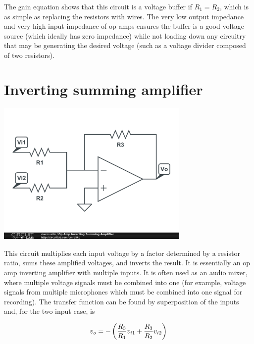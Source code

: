 The gain equation shows that this circuit is a voltage buffer if $R_1 = R_2$, which is as simple as replacing the resistors with wires.
The very low output impedance and very high input impedance of op amps ensures the buffer is a good voltage source (which ideally has zero impedance) while not loading down any circuitry that may be generating the desired voltage (such as a voltage divider composed of two resistors).

\section{Inverting summing amplifier}
\begin{center}
	\includegraphics[width=0.70\textwidth]{schematics/invsummingamp.PNG}
\end{center}

This circuit multiplies each input voltage by a factor determined by a resistor ratio, sums these amplified voltages, and inverts the result.
It is essentially an op amp inverting amplifier with multiple inputs.
It is often used as an audio mixer, where multiple voltage signals must be combined into one (for example, voltage signals from multiple microphones which must be combined into one signal for recording).
The transfer function can be found by superposition of the inputs and, for the two input case, is

\textcolor{red}{
\begin{equation}
\vout = -\left(\frac{R_3}{R_1}\vin[1] + \frac{R_3}{R_2}\vin[2]\right)
\label{eq:invertingsummingamplifier}
\end{equation}
}


